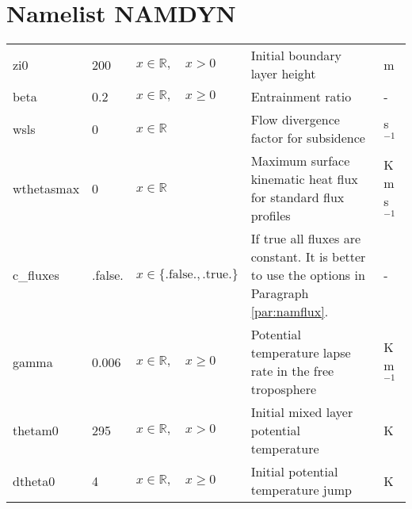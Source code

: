 \documentclass[twoside,11pt,fleqn,a4paper,english,openright]{report}
\begin{document}
\section{Namelist NAMDYN}\label{par:dynamics}
\begin{center}
  \tablelasttail{
        &&&&\\\hline
  }
\begin{supertabular}{|l|p{1.6cm}|p{4cm}|p{5cm}|l|}
zi0		&	200			& $x \in \mathbb{R}, \quad x > 0$		& Initial boundary layer height	&	m\\
beta	&	0.2			& $x \in \mathbb{R},\quad x \geq 0$	& Entrainment ratio								&	-\\
wsls	&	0				&	$x \in \mathbb{R}$								&	Flow divergence factor for subsidence	& s$^{-1}$\\
wthetasmax	& 0	&	$x \in \mathbb{R}$								&	Maximum surface kinematic heat flux for standard flux profiles	& K m s$^{-1}$\\
c\_fluxes	&	.false.	&	$x\in\{\text{.false.},\text{.true.}\}$	& If true all fluxes are constant. It is better to use the options in Paragraph \ref{par:namflux}.	& -\\
gamma	&	0.006		&	$x \in \mathbb{R}, \quad x \geq 0$		& Potential temperature lapse rate in the free troposphere	&	K m$^{-1}$\\
thetam0	& 295		&	$x \in \mathbb{R}, \quad x > 0$		& Initial mixed layer potential temperature	&	K\\
dtheta0	&	4			&	$x \in \mathbb{R},\quad x \geq 0$	& Initial potential temperature jump	&	K\\

\end{supertabular}
\end{center}
\end{document}
